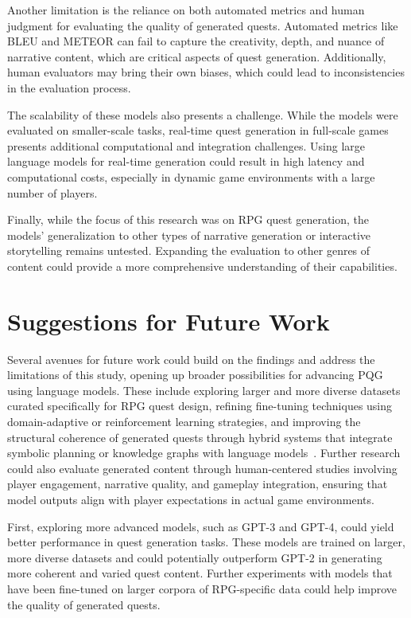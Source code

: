 Another limitation is the reliance on both automated metrics and human judgment for
evaluating the quality of generated quests. Automated metrics like BLEU and METEOR
can fail to capture the creativity, depth, and nuance of narrative content, which are critical
aspects of quest generation. Additionally, human evaluators may bring their own biases,
which could lead to inconsistencies in the evaluation process.

The scalability of these models also presents a challenge. While the models were
evaluated on smaller-scale tasks, real-time quest generation in full-scale games presents
additional computational and integration challenges. Using large language models for
real-time generation could result in high latency and computational costs, especially in
dynamic game environments with a large number of players.

Finally, while the focus of this research was on RPG quest generation, the models'
generalization to other types of narrative generation or interactive storytelling remains
untested. Expanding the evaluation to other genres of content could provide a more
comprehensive understanding of their capabilities.

\section{Suggestions for Future Work}

Several avenues for future work could build on the findings and address the limitations
of this study, opening up broader possibilities for advancing PQG using language models.
These include exploring larger and more diverse datasets curated specifically for
RPG quest design, refining fine-tuning techniques using domain-adaptive or reinforcement
learning strategies, and improving the structural coherence of generated quests through
hybrid systems that integrate symbolic planning or knowledge graphs with language models~\cite{ashby2023personalized}.
Further research could also evaluate generated content through human-centered
studies involving player engagement, narrative quality, and gameplay integration, ensuring
that model outputs align with player expectations in actual game environments.

First, exploring more advanced models, such as GPT-3 and GPT-4, could yield better
performance in quest generation tasks. These models are trained on larger, more diverse
datasets and could potentially outperform GPT-2 in generating more coherent and varied
quest content. Further experiments with models that have been fine-tuned on larger
corpora of RPG-specific data could help improve the quality of generated quests.

